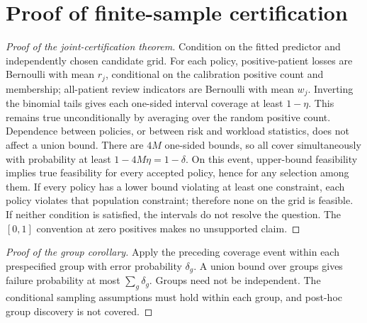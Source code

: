 \section*{Proof of finite-sample certification}
\begin{proof}[Proof of the joint-certification theorem]
Condition on the fitted predictor and independently chosen candidate grid. For each policy, positive-patient losses are Bernoulli with mean $r_j$, conditional on the calibration positive count and membership; all-patient review indicators are Bernoulli with mean $w_j$. Inverting the binomial tails gives each one-sided interval coverage at least $1-\eta$. This remains true unconditionally by averaging over the random positive count. Dependence between policies, or between risk and workload statistics, does not affect a union bound. There are $4M$ one-sided bounds, so all cover simultaneously with probability at least $1-4M\eta=1-\delta$. On this event, upper-bound feasibility implies true feasibility for every accepted policy, hence for any selection among them. If every policy has a lower bound violating at least one constraint, each policy violates that population constraint; therefore none on the grid is feasible. If neither condition is satisfied, the intervals do not resolve the question. The $[0,1]$ convention at zero positives makes no unsupported claim.
\end{proof}
\begin{proof}[Proof of the group corollary]
Apply the preceding coverage event within each prespecified group with error probability $\delta_g$. A union bound over groups gives failure probability at most $\sum_g\delta_g$. Groups need not be independent. The conditional sampling assumptions must hold within each group, and post-hoc group discovery is not covered.
\end{proof}

